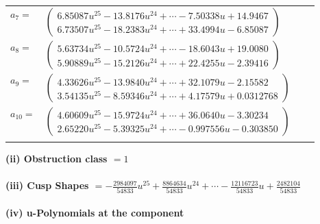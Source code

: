 \documentclass[1p]{elsarticle_modified}
\theoremstyle{definition}
\begin{document}
\begin{tabular}{m{7pt} m{180pt} m{7pt} m{180pt} }
\flushright $a_{7}=$&$\begin{pmatrix}6.85087 u^{25}-13.8176 u^{24}+\cdots-7.50338 u+14.9467\\6.73507 u^{25}-18.2383 u^{24}+\cdots+33.4994 u-6.85087\end{pmatrix}$ \\
\flushright $a_{8}=$&$\begin{pmatrix}5.63734 u^{25}-10.5724 u^{24}+\cdots-18.6043 u+19.0080\\5.90889 u^{25}-15.2126 u^{24}+\cdots+22.4255 u-2.39416\end{pmatrix}$ \\
\flushright $a_{9}=$&$\begin{pmatrix}4.33626 u^{25}-13.9840 u^{24}+\cdots+32.1079 u-2.15582\\3.54135 u^{25}-8.59346 u^{24}+\cdots+4.17579 u+0.0312768\end{pmatrix}$ \\
\flushright $a_{10}=$&$\begin{pmatrix}4.60609 u^{25}-15.9724 u^{24}+\cdots+36.0640 u-3.30234\\2.65220 u^{25}-5.39325 u^{24}+\cdots-0.997556 u-0.303850\end{pmatrix}$\\&\end{tabular}
\flushleft \textbf{(ii) Obstruction class $= 1$}\\~\\
\flushleft \textbf{(iii) Cusp Shapes $= -\frac{2984097}{54833} u^{25}+\frac{8864634}{54833} u^{24}+\cdots-\frac{12116723}{54833} u+\frac{2482104}{54833}$}\\~\\
\newpage\renewcommand{\arraystretch}{1}
\flushleft \textbf{(iv) u-Polynomials at the component}\newline \\
\end{document}
